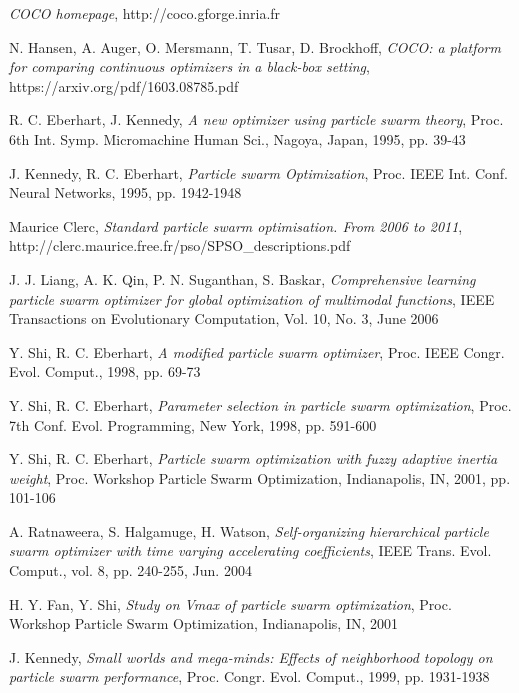 \documentclass[12pt, twoside, openany, abstract=on]{report}
\theoremstyle{definition}
\begin{document}
\begin{thebibliography}{11}
 \emph{COCO homepage}, http://coco.gforge.inria.fr

 N. Hansen, A. Auger, O. Mersmann, T. Tusar, D. Brockhoff, \emph{COCO: a platform for comparing continuous optimizers in a black-box setting}, https://arxiv.org/pdf/1603.08785.pdf


 R. C. Eberhart, J. Kennedy, \emph{A new optimizer using particle swarm theory}, Proc. 6th Int. Symp. Micromachine Human Sci., Nagoya, Japan, 1995, pp. 39-43

 J. Kennedy, R. C. Eberhart, \emph{Particle swarm Optimization}, Proc. IEEE Int. Conf. Neural Networks, 1995, pp. 1942-1948

 Maurice Clerc, \emph{Standard particle swarm optimisation. From 2006 to 2011}, http://clerc.maurice.free.fr/pso/SPSO\_descriptions.pdf


 J. J. Liang, A. K. Qin, P. N. Suganthan, S. Baskar, \emph{Comprehensive learning particle swarm optimizer for global optimization of multimodal functions}, IEEE Transactions on Evolutionary Computation, Vol. 10, No. 3, June 2006

 Y. Shi, R. C. Eberhart, \emph{A modified particle swarm optimizer}, Proc. IEEE Congr. Evol. Comput., 1998, pp. 69-73

 Y. Shi, R. C. Eberhart, \emph{Parameter selection in particle swarm optimization}, Proc. 7th Conf. Evol. Programming, New York, 1998, pp. 591-600

 Y. Shi, R. C. Eberhart, \emph{Particle swarm optimization with fuzzy adaptive inertia weight}, Proc. Workshop Particle Swarm Optimization, Indianapolis, IN, 2001, pp. 101-106

 A. Ratnaweera, S. Halgamuge, H. Watson, \emph{Self-organizing hierarchical particle swarm optimizer with time varying accelerating coefficients}, IEEE Trans. Evol. Comput., vol. 8, pp. 240-255, Jun. 2004

 H. Y. Fan, Y. Shi, \emph{Study on Vmax of particle swarm optimization}, Proc. Workshop Particle Swarm Optimization, Indianapolis, IN, 2001

 J. Kennedy, \emph{Small worlds and mega-minds: Effects of neighborhood topology on particle swarm performance}, Proc. Congr. Evol. Comput., 1999, pp. 1931-1938


\end{thebibliography}
\end{document}
